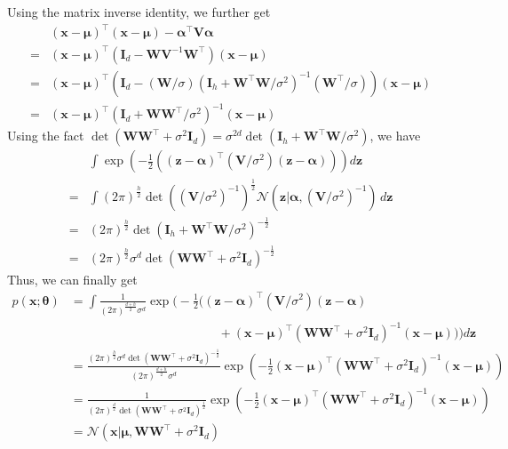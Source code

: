 \documentclass[11pt]{article}
\begin{document}
\begin{enumerate}
\begin{enumerate}
    Using the matrix inverse identity, we further get
    \begin{align*}
    & (\bm x-\bm\mu)^{\top}(\bm x-\bm\mu)-\bm\alpha^{\top}\bm V\bm\alpha \\
    =& (\bm x-\bm\mu)^{\top}(\bm I_d-\bm W\bm V^{-1}\bm W^{\top})(\bm x-\bm\mu) \\
    =& (\bm x-\bm\mu)^{\top}\left(\bm I_d-(\bm W/\sigma)\left(\bm I_h+\bm W^{\top}\bm W/\sigma^2\right)^{-1}(\bm W^{\top}/\sigma)\right)(\bm x-\bm\mu) \\
    =& (\bm x-\bm\mu)^{\top}\left(\bm I_d+\bm W\bm W^{\top}/\sigma^2\right)^{-1}(\bm x-\bm\mu)
    \end{align*}
    Using the fact $\det(\bm W\bm W^{\top}+\sigma^2\bm I_d)=\sigma^{2d}\det(\bm I_h+\bm W^{\top}\bm W/\sigma^2)$, we have
    \begin{align*}
    & \int\exp\left(-\frac{1}{2}\left((\bm z-\bm\alpha)^{\top}(\bm V/\sigma^2)(\bm z-\bm\alpha)\right)\right)d\bm z \\
    =& \int (2\pi)^\frac{h}{2}\det\left((\bm V/\sigma^2)^{-1}\right)^\frac{1}{2}\mathcal{N}(\bm z|\bm\alpha,(\bm V/\sigma^2)^{-1})\,d\bm z \\
    =& (2\pi)^\frac{h}{2}\det\left(\bm I_h+\bm W^{\top}\bm W/\sigma^2\right)^{-\frac{1}{2}} \\
    =& (2\pi)^\frac{h}{2}\sigma^d\det\left(\bm W\bm W^{\top}+\sigma^2\bm I_d\right)^{-\frac{1}{2}}
    \end{align*}
    Thus, we can finally get
    \begin{align*}
    p(\bm x;\bm\theta)
    &= \int\frac{1}{(2\pi)^\frac{d+h}{2}\sigma^d}\exp\Bigg(-\frac{1}{2}\bigg((\bm z-\bm\alpha)^{\top}(\bm V/\sigma^2)(\bm z-\bm\alpha) \\
    &\hspace{5cm} +(\bm x-\bm\mu)^{\top}\left(\bm W\bm W^{\top}+\sigma^2\bm I_d\right)^{-1}(\bm x-\bm\mu)\bigg)\Bigg)d\bm z \\
    &= \frac{(2\pi)^\frac{h}{2}\sigma^d\det\left(\bm W\bm W^{\top}+\sigma^2\bm I_d\right)^{-\frac{1}{2}}}{(2\pi)^\frac{d+h}{2}\sigma^d}\exp\left(-\frac{1}{2}(\bm x-\bm\mu)^{\top}\left(\bm W\bm W^{\top}+\sigma^2\bm I_d\right)^{-1}(\bm x-\bm\mu)\right) \\
    &= \frac{1}{(2\pi)^\frac{d}{2}\det\left(\bm W\bm W^{\top}+\sigma^2\bm I_d\right)^\frac{1}{2}}\exp\left(-\frac{1}{2}(\bm x-\bm\mu)^{\top}\left(\bm W\bm W^{\top}+\sigma^2\bm I_d\right)^{-1}(\bm x-\bm\mu)\right) \\
    &= \mathcal{N}(\bm x|\bm\mu,\bm W\bm W^{\top}+\sigma^2\bm I_d)

\end{align*}
\end{enumerate}
\end{enumerate}
\end{document}
